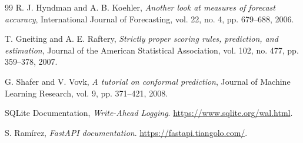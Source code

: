 \documentclass[12pt,a4paper,oneside]{report}
\numberwithin{equation}{chapter}
\numberwithin{figure}{chapter}
\numberwithin{table}{chapter}
\theoremstyle{definition}
\begin{document}
\begin{thebibliography}{99}
R. J. Hyndman and A. B. Koehler,
\emph{Another look at measures of forecast accuracy},
International Journal of Forecasting, vol. 22, no. 4, pp. 679--688, 2006.

T. Gneiting and A. E. Raftery,
\emph{Strictly proper scoring rules, prediction, and estimation},
Journal of the American Statistical Association, vol. 102, no. 477, pp. 359--378, 2007.

G. Shafer and V. Vovk,
\emph{A tutorial on conformal prediction},
Journal of Machine Learning Research, vol. 9, pp. 371--421, 2008.

SQLite Documentation, \emph{Write-Ahead Logging}.
\url{https://www.sqlite.org/wal.html}.

S. Ram\'irez, \emph{FastAPI documentation}.
\url{https://fastapi.tiangolo.com/}.

\end{thebibliography}
\end{document}

